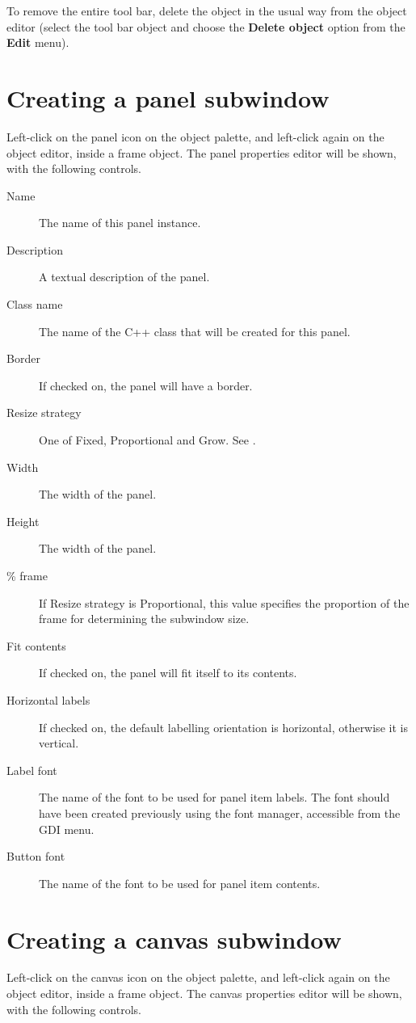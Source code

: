 To remove the entire tool bar, delete the object in the usual
way from the object editor (select the tool bar object and choose
the {\bf Delete object} option from the {\bf Edit} menu).

\section{Creating a panel subwindow}

Left-click on the panel icon on the object palette, and left-click again
on the object editor, inside a frame object. The panel properties editor
will be shown, with the following controls.

\begin{description}
\item[Name] The name of this panel instance.
\item[Description] A textual description of the panel.
\item[Class name] The name of the C++ class that will be created for
this panel.
\item[Border] If checked on, the panel will have a border.
\item[Resize strategy] One of Fixed, Proportional and Grow.
See .
\item[Width] The width of the panel.
\item[Height] The width of the panel.
\item[\% frame] If Resize strategy is Proportional, this value specifies
the proportion of the frame for determining the subwindow size.
\item[Fit contents] If checked on, the panel will fit itself to its
contents.
\item[Horizontal labels] If checked on, the default labelling orientation
is horizontal, otherwise it is vertical.
\item[Label font] The name of the font to be used for panel item labels.
The font should have been created previously using the font manager,
accessible from the GDI menu.
\item[Button font] The name of the font to be used for panel item contents.
\end{description}

\section{Creating a canvas subwindow}

Left-click on the canvas icon on the object palette, and left-click
again on the object editor, inside a frame object. The canvas properties
editor will be shown, with the following controls.

